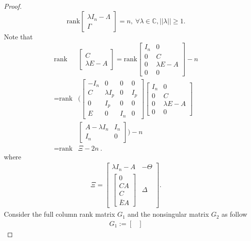 \documentclass[english]{cccconf}
\theoremstyle{definition}
\begin{document}
\begin{proof}
\begin{equation}
\textrm{rank}\begin{bmatrix}
\lambda I_n-\Lambda\\\Gamma
\end{bmatrix}=n,\ \forall\lambda\in\mathbb{C}, ||\lambda||\geq1.
\end{equation}
Note that
\begin{align}
\textrm{rank}&\begin{bmatrix}
C\\\lambda E-A
\end{bmatrix}=\textrm{rank}\begin{bmatrix}
I_n&0\\0&C\\0&\lambda E-A\\0&0
\end{bmatrix}-n\nonumber\\
=\textrm{rank}&\Bigg(\begin{bmatrix}
-I_n&0&0&0\\C&\lambda I_p&0&I_p\\0&I_p&0&0\\E&0&I_n&0
\end{bmatrix}\begin{bmatrix}
I_n&0\\0&C\\0&\lambda E-A\\0&0
\end{bmatrix}\nonumber\\ &\begin{bmatrix}
A-\lambda I_n&I_n\\I_n&0
\end{bmatrix}\Bigg)-n\\
=\textrm{rank}&\Xi-2n\ .\nonumber
\end{align}
where
\begin{align*}
\Xi=\begin{bmatrix}
\lambda I_n-A&-\Theta\\\begin{bmatrix}
0\\CA\\C\\\bar{E}A
\end{bmatrix}&\Delta
\end{bmatrix}.
\end{align*}
Consider the full column rank matrix $G_1$ and the nonsingular matrix $G_2$  as follow
\begin{align*}
G_1:=\begin{bmatrix}

\end{bmatrix}
\end{align*}
\end{proof}
\end{document}
